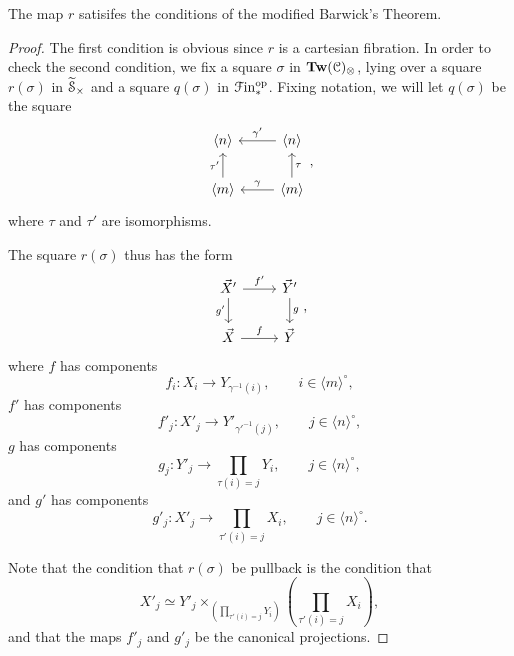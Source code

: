 \documentclass[main.tex]{subfiles}
\begin{document}
\begin{proposition}
  The map $r$ satisifes the conditions of the modified Barwick's Theorem.
\end{proposition}
\begin{proof}
  The first condition is obvious since $r$ is a cartesian fibration. In order to check the second condition, we fix a square $\sigma$ in $\mathbf{Tw}(\mathcal{C})_{\otimes}$, lying over a square $r(\sigma)$ in $\widetilde{\mathcal{S}}_{\times}$ and a square $q(\sigma)$ in $\mathcal{F}\mathrm{in}_{*}^{\mathrm{op}}$. Fixing notation, we will let $q(\sigma)$ be the square
  \begin{equation*}
    \begin{tikzcd}
      \langle n \rangle
      & \langle n \rangle
      \arrow[l, swap, "\gamma'"]
      \\
      \langle m \rangle
      \arrow[u, "\tau'"]
      & \langle m \rangle
      \arrow[u, swap, "\tau"]
      \arrow[l, swap, "\gamma"]
    \end{tikzcd},
  \end{equation*}
  where $\tau$ and $\tau'$ are isomorphisms.

  The square $r(\sigma)$ thus has the form
  \begin{equation*}
    \begin{tikzcd}
      \vec{X}'
      \arrow[r, "f'"]
      \arrow[d, swap, "g'"]
      & \vec{Y}'
      \arrow[d, "g"]
      \\
      \vec{X}
      \arrow[r, "f"]
      & \vec{Y}
    \end{tikzcd},
  \end{equation*}
  where $f$ has components
  \begin{equation*}
    f_{i}\colon X_{i} \to Y_{\gamma^{-1}(i)},\qquad i \in \langle m \rangle^{\circ},
  \end{equation*}
  $f'$ has components
  \begin{equation*}
    f'_{j}\colon X'_{j} \to Y'_{\gamma'^{-1}(j)},\qquad j \in \langle n \rangle^{\circ},
  \end{equation*}
  $g$ has components
  \begin{equation*}
    g_{j}\colon Y'_{j} \to \prod_{\tau(i) = j} Y_{i},\qquad j \in \langle n \rangle^{\circ},
  \end{equation*}
  and $g'$ has components
  \begin{equation*}
    g'_{j}\colon X'_{j} \to \prod_{\tau'(i) = j} X_{i},\qquad j \in \langle n \rangle^{\circ}.
  \end{equation*}

  Note that the condition that $r(\sigma)$ be pullback is the condition that
  \begin{equation*}
    X'_{j} \simeq Y'_{j} \times_{\left( \prod_{\tau'(i) = j} Y_{i} \right)} \left( \prod_{\tau'(i) = j} X_{i} \right),
  \end{equation*}
  and that the maps $f'_{j}$ and $g'_{j}$ be the canonical projections.


\end{proof}
\end{document}
